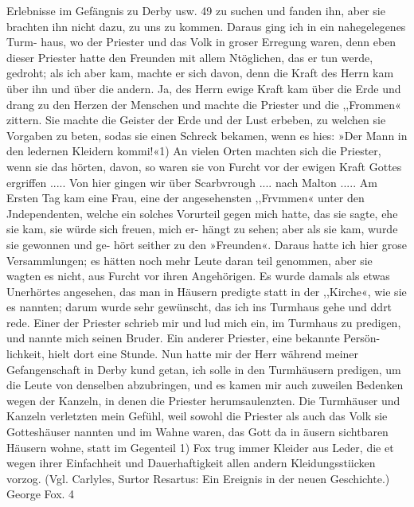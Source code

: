 Erlebnisse im Gefängnis zu Derby usw. 49
zu suchen und fanden ihn, aber sie brachten ihn nicht dazu, zu
uns zu kommen. Daraus ging ich in ein nahegelegenes Turm-
haus, wo der Priester und das Volk in groser Erregung waren,
denn eben dieser Priester hatte den Freunden mit allem Ntöglichen,
das er tun werde, gedroht; als ich aber kam, machte er sich davon,
denn die Kraft des Herrn kam über ihn und über die andern.
Ja, des Herrn ewige Kraft kam über die Erde und drang zu
den Herzen der Menschen und machte die Priester und die
,,Frommen« zittern. Sie machte die Geister der Erde und der
Lust erbeben, zu welchen sie Vorgaben zu beten, sodas sie einen
Schreck bekamen, wenn es hies: »Der Mann in den ledernen
Kleidern kommi!«1) An vielen Orten machten sich die Priester,
wenn sie das hörten, davon, so waren sie von Furcht vor der
ewigen Kraft Gottes ergriffen .....
Von hier gingen wir über Scarbvrough .... nach Malton .....
Am Ersten Tag kam eine Frau, eine der angesehensten ,,Frvmmen«
unter den Jndependenten, welche ein solches Vorurteil gegen mich
hatte, das sie sagte, ehe sie kam, sie würde sich freuen, mich er-
hängt zu sehen; aber als sie kam, wurde sie gewonnen und ge-
hört seither zu den »Freunden«.
Daraus hatte ich hier grose Versammlungen; es hätten noch
mehr Leute daran teil genommen, aber sie wagten es nicht, aus
Furcht vor ihren Angehörigen. Es wurde damals als etwas
Unerhörtes angesehen, das man in Häusern predigte statt in der
,,Kirche«, wie sie es nannten; darum wurde sehr gewünscht, das
ich ins Turmhaus gehe und ddrt rede. Einer der Priester schrieb
mir und lud mich ein, im Turmhaus zu predigen, und nannte
mich seinen Bruder. Ein anderer Priester, eine bekannte Persön-
lichkeit, hielt dort eine Stunde. Nun hatte mir der Herr während
meiner Gefangenschaft in Derby kund getan, ich solle in den
Turmhäusern predigen, um die Leute von denselben abzubringen,
und es kamen mir auch zuweilen Bedenken wegen der Kanzeln,
in denen die Priester herumsaulenzten. Die Turmhäuser und
Kanzeln verletzten mein Gefühl, weil sowohl die Priester als auch
das Volk sie Gotteshäuser nannten und im Wahne waren, das
Gott da in äusern sichtbaren Häusern wohne, statt im Gegenteil
1) Fox trug immer Kleider aus Leder, die et wegen ihrer Einfachheit und
Dauerhaftigkeit allen andern Kleidungsstiicken vorzog. (Vgl. Carlyles, Surtor
Resartus: Ein Ereignis in der neuen Geschichte.)
George Fox. 4


